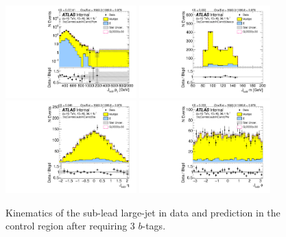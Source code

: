 \begin{figure}[htbp!]
\begin{center}
\includegraphics[width=0.45\textwidth,angle=-90]{figures/boosted/Control/b77_ThreeTag_Control_sublHCand_Pt_m_1.pdf}
\includegraphics[width=0.45\textwidth,angle=-90]{figures/boosted/Control/b77_ThreeTag_Control_sublHCand_Mass_s.pdf}\\
\includegraphics[width=0.45\textwidth,angle=-90]{figures/boosted/Control/b77_ThreeTag_Control_sublHCand_Eta.pdf}
\includegraphics[width=0.45\textwidth,angle=-90]{figures/boosted/Control/b77_ThreeTag_Control_sublHCand_Phi.pdf}
  \caption{Kinematics of the sub-lead large-\R jet in data and prediction in the control region after requiring 3 $b$-tags. }
  \label{fig:boosted-3b-control-ak10-subl}
\end{center}
\end{figure}

